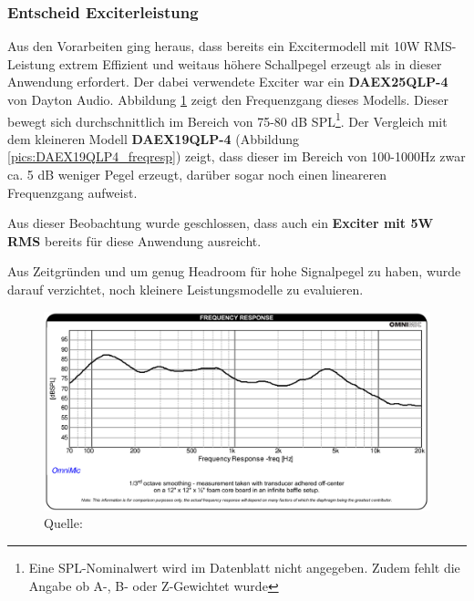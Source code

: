 \subsubsection{Entscheid Exciterleistung}
Aus den Vorarbeiten ging heraus, dass bereits ein Excitermodell mit 10W RMS-Leistung extrem Effizient und weitaus höhere Schallpegel erzeugt als in dieser Anwendung erfordert. Der dabei verwendete Exciter war ein \textbf{DAEX25QLP-4} von Dayton Audio. Abbildung \ref{pics:DAEX25QLP4_freqresp} zeigt den Frequenzgang dieses Modells. Dieser bewegt sich durchschnittlich im Bereich von 75-80 dB SPL\footnote{Eine SPL-Nominalwert wird im Datenblatt nicht angegeben. Zudem fehlt die Angabe ob A-, B- oder Z-Gewichtet wurde}. Der Vergleich mit dem kleineren Modell \textbf{DAEX19QLP-4} (Abbildung \ref{pics:DAEX19QLP4_freqresp}) zeigt, dass dieser im Bereich von 100-1000Hz zwar ca. 5 dB weniger Pegel erzeugt, darüber sogar noch einen lineareren Frequenzgang aufweist.\\
\begin{center}
	\begin{minipage}{\textwidth*7/8}
		\centering
		{\large Aus dieser Beobachtung wurde geschlossen, dass auch ein \textbf{Exciter mit 5W RMS} bereits für diese Anwendung ausreicht.}
		\vspace{6mm}
	\end{minipage}
\end{center}
Aus Zeitgründen und um genug Headroom für hohe Signalpegel zu haben, wurde darauf verzichtet, noch kleinere Leistungsmodelle zu evaluieren.
\begin{figure}[H]
	\centering
	\includegraphics[width=\textwidth*7/8]{pictures/DAEX25QLP4_freqresp.png}
	\caption{Quelle: \cite{DAEX25QLP4spec}}
	\label{pics:DAEX25QLP4_freqresp}
\end{figure}
